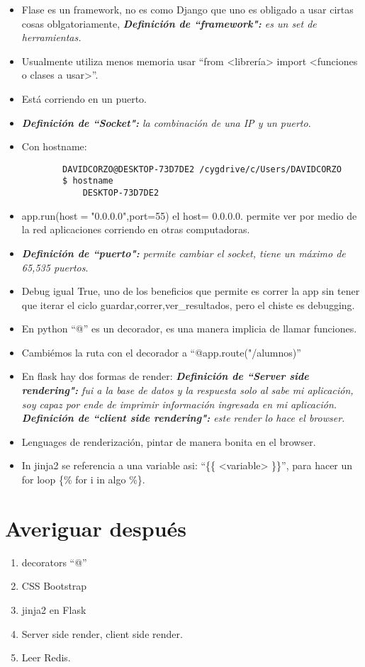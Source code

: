 \begin{itemize}
    \item Flase es un framework, no es como Django que uno es obligado a usar cirtas cosas oblgatoriamente, \emph{\textbf{Definición de ``framework":} es un set de herramientas.}
    \item Usualmente utiliza menos memoria usar ``from <librería> import <funciones o clases a usar>''.
    \item Está corriendo en un puerto.
    \item \emph{\textbf{Definición de ``Socket":} la combinación de una IP  y un puerto}.
    \item Con hostname:
    \begin{verbatim}
        DAVIDCORZO@DESKTOP-73D7DE2 /cygdrive/c/Users/DAVIDCORZO
        $ hostname
            DESKTOP-73D7DE2
    \end{verbatim}
    
    \item app.run(host$=$"0.0.0.0",port=55) el host= 0.0.0.0. permite ver por medio de la red aplicaciones corriendo en otras computadoras.
    \item \emph{\textbf{Definición de ``puerto":} permite cambiar el socket, tiene un máximo de 65,535 puertos}.
    \item Debug igual True, uno de los beneficios que permite es correr la app sin tener que iterar el ciclo guardar,correr,ver\_resultados, pero el chiste es debugging.
    \item En python ``@'' es un decorador, es una manera implicia de llamar funciones.
    \item Cambiémos la ruta con el decorador a ``@app.route("/alumnos)''
    \item En flask hay dos formas de render: \emph{\textbf{Definición de ``Server side rendering":} fui a la base de datos y la respuesta solo al sabe mi aplicación, soy capaz por ende de imprimir información ingresada en mi aplicación.} \emph{\textbf{Definición de ``client side rendering":} este render lo hace el browser.}
    \item Lenguages de renderización, pintar de manera bonita en el browser.
    
    \item In jinja2 se referencia a una variable asi: ``\{\{ <variable> \}\}'', para hacer un for loop \{\% for i in algo \%\}.
\end{itemize}

\section{Averiguar después}
\begin{enumerate}
    \item decorators ``@''
    \item CSS Bootstrap
    \item jinja2 en Flask 
    \item Server side render, client side render.
    \item Leer Redis.
\end{enumerate}
